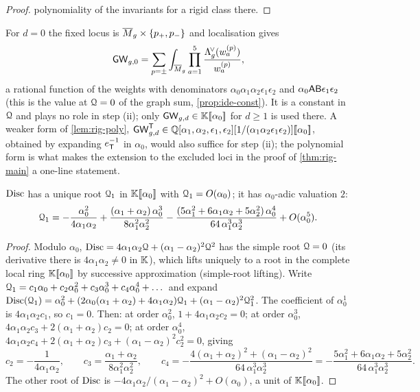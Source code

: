 \begin{proof}
polynomiality of the invariants for a rigid class there. 
\end{proof}

\begin{rmk}
\label{rmk:rig-d0}
For $d=0$ the fixed locus is $\overline{M}_g\times\{p_+,p_-\}$ and localisation gives
\[
\mathsf{GW}_{g,0}=\sum_{p=\pm}\int_{\overline{M}_g}\prod_{a=1}^{5}\frac{\Lambda^{\!\vee}_g(w^{(p)}_a)}{w^{(p)}_a},
\]
a rational function of the weights with denominators $\alpha_0\alpha_1\alpha_2\epsilon_1\epsilon_2$ and $\alpha_0\mathsf{A}\mathsf{B}\epsilon_1\epsilon_2$ (this is the value at $\mathcal{Q}=0$ of the graph sum, \cref{prop:ide-const}). It is a constant in $\mathcal{Q}$ and plays no role in step (ii); only $\mathsf{GW}_{g,d}\in\mathbb{K}[\![ \alpha_0 ]\!]$ for $d\geq 1$ is used there. A weaker form of \cref{lem:rig-poly}, $\mathsf{GW}^{\mathsf{T}}_{g,d}\in\mathbb{Q}[\alpha_1,\alpha_2,\epsilon_1,\epsilon_2][1/(\alpha_1\alpha_2\epsilon_1\epsilon_2)][\![ \alpha_0 ]\!]$, obtained by expanding $e_{\mathsf{T}}^{-1}$ in $\alpha_0$, would also suffice for step (ii); the polynomial form is what makes the extension to the excluded loci in the proof of \cref{thm:rig-main} a one-line statement.
\end{rmk}

\begin{lem}
\label{lem:rig-root}
$\operatorname{Disc}$ has a unique root $\mathcal{Q}_1$ in $\mathbb{K}[\![ \alpha_0 ]\!]$ with $\mathcal{Q}_1=O(\alpha_0)$; it has $\alpha_0$-adic valuation $2$:
\[
\mathcal{Q}_1=-\frac{\alpha_0^2}{4\alpha_1\alpha_2}+\frac{(\alpha_1+\alpha_2)\,\alpha_0^3}{8\alpha_1^2\alpha_2^2}-\frac{(5\alpha_1^2+6\alpha_1\alpha_2+5\alpha_2^2)\,\alpha_0^4}{64\,\alpha_1^3\alpha_2^3}+O(\alpha_0^5).
\]
\end{lem}

\begin{proof}
Modulo $\alpha_0$, $\operatorname{Disc}=4\alpha_1\alpha_2\mathcal{Q}+(\alpha_1-\alpha_2)^2\mathcal{Q}^2$ has the simple root $\mathcal{Q}=0$ (its derivative there is $4\alpha_1\alpha_2\neq 0$ in $\mathbb{K}$), which lifts uniquely to a root in the complete local ring $\mathbb{K}[\![ \alpha_0 ]\!]$ by successive approximation (simple-root lifting). Write $\mathcal{Q}_1=c_1\alpha_0+c_2\alpha_0^2+c_3\alpha_0^3+c_4\alpha_0^4+\dots$ and expand $\operatorname{Disc}(\mathcal{Q}_1)=\alpha_0^2+(2\alpha_0(\alpha_1+\alpha_2)+4\alpha_1\alpha_2)\mathcal{Q}_1+(\alpha_1-\alpha_2)^2\mathcal{Q}_1^2$. The coefficient of $\alpha_0^1$ is $4\alpha_1\alpha_2c_1$, so $c_1=0$. Then: at order $\alpha_0^2$, $1+4\alpha_1\alpha_2c_2=0$; at order $\alpha_0^3$, $4\alpha_1\alpha_2c_3+2(\alpha_1+\alpha_2)c_2=0$; at order $\alpha_0^4$, $4\alpha_1\alpha_2c_4+2(\alpha_1+\alpha_2)c_3+(\alpha_1-\alpha_2)^2c_2^2=0$, giving
\[
c_2=-\frac{1}{4\alpha_1\alpha_2},\qquad c_3=\frac{\alpha_1+\alpha_2}{8\alpha_1^2\alpha_2^2},\qquad
c_4=-\frac{4(\alpha_1+\alpha_2)^2+(\alpha_1-\alpha_2)^2}{64\,\alpha_1^3\alpha_2^3}=-\frac{5\alpha_1^2+6\alpha_1\alpha_2+5\alpha_2^2}{64\,\alpha_1^3\alpha_2^3}.
\]
The other root of $\operatorname{Disc}$ is $-4\alpha_1\alpha_2/(\alpha_1-\alpha_2)^2+O(\alpha_0)$, a unit of $\mathbb{K}[\![ \alpha_0 ]\!]$.
\end{proof}

